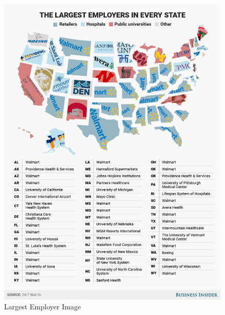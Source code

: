 \documentclass[]{article}
\begin{document}
\begin{figure}
\centering
\includegraphics{BILargestEmployer.png}
\caption{Largest Employer Image}
\end{figure}
\end{document}
